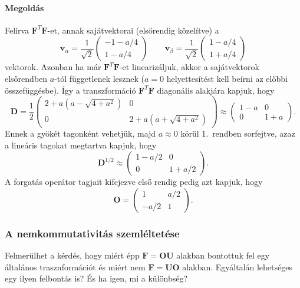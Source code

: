 \documentclass[12pt,a4paper]{scrartcl}
\let\mathbf\bm
\begin{document}
\paragraph{Megoldás} Felírva ${{\mathbf{F}}^T}{\mathbf{F}}$-et, annak sajátvektorai (elsőrendig közelítve) a
\[{{\mathbf{v}}_\alpha } = \frac{1}{{\sqrt 2 }}\left( {\begin{array}{*{20}{c}}
  { - 1 - a/4} \\ 
  {1 - a/4} 
\end{array}} \right)\quad \quad {{\mathbf{v}}_\beta } = \frac{1}{{\sqrt 2 }}\left( {\begin{array}{*{20}{c}}
  {1 - a/4} \\ 
  {1 + a/4} 
\end{array}} \right)\]
vektorok. Azonban ha már ${{\mathbf{F}}^T}{\mathbf{F}}$-et linearizáljuk, akkor a sajátvektorok elsőrendben $a$-tól függetlenek lesznek ($a=0$ helyettesítést kell beírni az előbbi összefüggésbe). Így a transzformáció ${{\mathbf{F}}^T}{\mathbf{F}}$ diagonális alakjára kapjuk, hogy
\[{\mathbf{D}} = \frac{1}{2}\left( {\begin{array}{*{20}{c}}
  {2 + a\left( {a - \sqrt {4 + {a^2}} } \right)}&0 \\ 
  0&{2 + a\left( {a + \sqrt {4 + {a^2}} } \right)} 
\end{array}} \right) \approx \left( {\begin{array}{*{20}{c}}
  {1 - a}&0 \\ 
  0&{1 + a} 
\end{array}} \right).\]
Ennek a gyökét tagonként vehetjük, majd $a \approx 0$ körül 1.\ rendben sorfejtve, azaz a lineáris tagokat megtartva kapjuk, hogy
\[{{\mathbf{D}}^{1/2}} \approx \left( {\begin{array}{*{20}{c}}
  {1 - a/2}&0 \\ 
  0&{1 + a/2} 
\end{array}} \right).\]
A forgatás operátor tagjait kifejezve első rendig pedig azt kapjuk, hogy 
\[{\mathbf{O}} = \left( {\begin{array}{*{20}{c}}
  1&{a/2} \\ 
  { - a/2}&1 
\end{array}} \right).\]
\normalsize

\subsubsection{A nemkommutativitás szemléltetése}
Felmerülhet a kérdés, hogy miért épp ${\mathbf{F}} = {\mathbf{OU}}$ alakban bontottuk fel egy általános trasznformációt és miért nem ${\mathbf{F}} = {\mathbf{UO}}$ alakban. Egyáltalán lehetséges egy ilyen felbontás is? És ha igen, mi a különbség?
\end{document}
